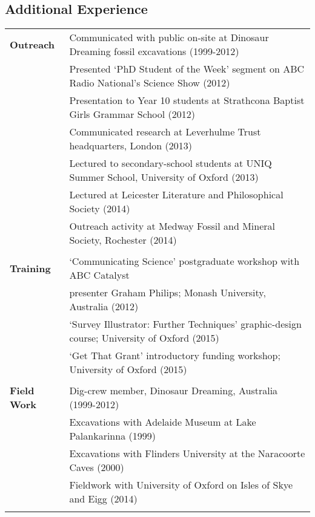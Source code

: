 \documentclass[a4paper, oneside, final]{scrartcl} %
\begin{document}
\begin{center}

\section{Additional Experience}

\begin{flushleft}

\begin{tabular}{ @{} >{\bfseries}l @{\hspace{6ex}} l }
Outreach & Communicated with public on-site at Dinosaur Dreaming fossil excavations (1999-2012)\\
\rule{0pt}{4ex}
& Presented `PhD Student of the Week' segment on ABC Radio National's Science Show (2012)\\
\rule{0pt}{4ex}
& Presentation to Year 10 students at Strathcona Baptist Girls Grammar School (2012)\\
\rule{0pt}{4ex}
& Communicated research at Leverhulme Trust headquarters, London (2013)\\
\rule{0pt}{4ex}
& Lectured to secondary-school students at UNIQ Summer School, University of Oxford (2013)\\
\rule{0pt}{4ex}
& Lectured at Leicester Literature and Philosophical Society (2014)\\
\rule{0pt}{4ex}
& Outreach activity at Medway Fossil and Mineral Society, Rochester (2014)\\
\\
Training & `Communicating Science' postgraduate workshop with ABC Catalyst\\ 
& presenter Graham Philips; Monash University, Australia (2012)\\
\rule{0pt}{4ex}
& `Survey Illustrator: Further Techniques' graphic-design course; University of Oxford (2015)\\
\rule{0pt}{4ex}
& `Get That Grant' introductory funding workshop; University of Oxford (2015)\\
\\
Field Work & Dig-crew member, Dinosaur Dreaming, Australia (1999-2012)\\
\rule{0pt}{4ex}
& Excavations with Adelaide Museum at Lake Palankarinna (1999)\\
\rule{0pt}{4ex}
& Excavations with Flinders University at the Naracoorte Caves (2000)\\
\rule{0pt}{4ex}
& Fieldwork with University of Oxford on Isles of Skye and Eigg (2014)\\
\\
\end{tabular}


\end{flushleft}
\end{center}
\end{document}
